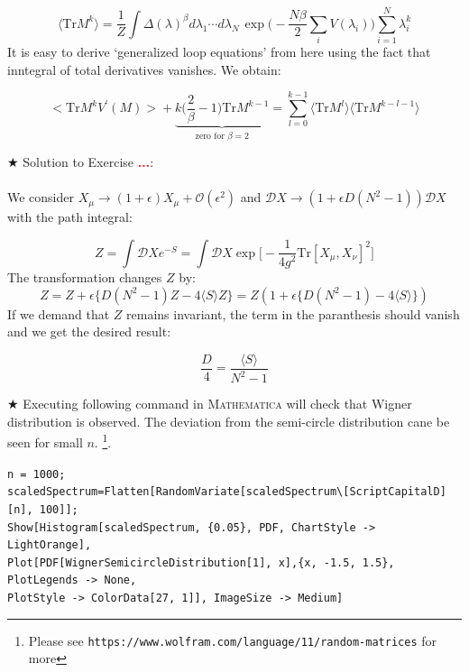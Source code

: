 \documentclass[11pt]{article}
\newcommand{\TODO}[1]{\textcolor{red}{{\bf #1}}}
\newcommand{\MA}{\textsc{Mathematica }}
\begin{document}
\begin{equation} 
\langle \mbox{Tr} M^k  \rangle = \frac{1}{Z} \int \Delta(\lambda)^{\beta} 
	d\lambda_1 \cdots d\lambda_{N~} \exp\Bigg(-\frac{N\beta}{2} \sum_{i} V(\lambda_{i})\Bigg)  \sum_{i=1}^{N} \lambda_{i}^k
\end{equation}
It is easy to derive `generalized loop equations' from here using the fact that inntegral of total derivatives vanishes. We obtain:

\begin{equation}
		\Big< \mathrm{Tr} M^{k} V^{\prime}(M) \Big> +  \underbrace{k \Bigg(\frac{2}{\beta} - 1 \Bigg) \mathrm{Tr} M^{k-1}}_{\text{zero for $\beta=2$}} = \sum_{l=0}^{k-1} \langle \mathrm{Tr} M^{l} \rangle  \langle \mathrm{Tr} M^{k-l-1} \rangle
\end{equation}
 

\noindent $\bigstar$ Solution to Exercise \TODO{...}: 
\\ \\ 
We consider $ X_{\mu} \to (1 + \epsilon) X_{\mu} + \mathcal{O}(\epsilon^2)$
and $\mathcal{D}X \to (1 + \epsilon D (N^2-1))\mathcal{D}X$ with the path integral:

\begin{equation}
Z = \int \mathcal{D}X e^{-S} = \int \mathcal{D}X \exp\Big[-\frac{1}{4g^2} \mbox{Tr} [X_\mu,X_\nu]^2\Big]
\end{equation}
The transformation changes $Z$ by:
\begin{equation}
	Z = Z + \epsilon \Big\{ D(N^2 -1)Z - 4\langle S \rangle Z  \Big\} = Z ( 1 + \epsilon \Big\{ D(N^2 -1) - 4\langle S \rangle   \Big\})
\end{equation}
If we demand that $Z$ remains invariant, the term in the paranthesis should vanish and we get the desired result:

\begin{equation}
	\frac{D}{4} = \frac{\langle S \rangle}{N^2 - 1 }
\end{equation}



\noindent $\bigstar$ Executing following command in \MA will check that Wigner distribution is 
observed. The deviation from the semi-circle distribution cane be seen for small 
$n$. \footnote{Please see \texttt{https://www.wolfram.com/language/11/random-matrices} for more}.  

\begin{mdframed}[backgroundcolor=magenta!3]
	\begin{footnotesize} 
		\verb"n = 1000;"\\ 
		\verb"scaledSpectrum=Flatten[RandomVariate[scaledSpectrum\[ScriptCapitalD][n], 100]];"\\
		\verb"Show[Histogram[scaledSpectrum, {0.05}, PDF, ChartStyle -> LightOrange], "  \\ 
		\verb"Plot[PDF[WignerSemicircleDistribution[1], x],{x, -1.5, 1.5}, PlotLegends -> None, " \\
		\verb"PlotStyle -> ColorData[27, 1]], ImageSize -> Medium]"
	\end{footnotesize} 
\end{mdframed}
\end{document}
